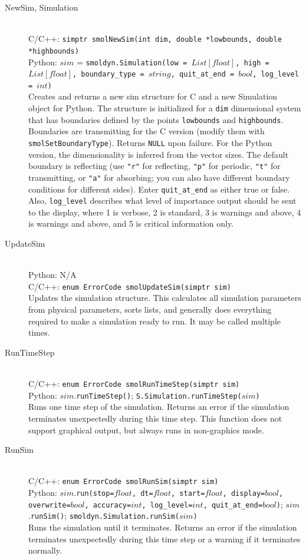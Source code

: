 \documentclass {scrbook}
\newcommand {\ttt} {\texttt}
\begin{document}
\begin{description}

\item[NewSim, Simulation]
\hfill \\
C/C++: \ttt{simptr smolNewSim(int dim, double *lowbounds, double *highbounds)}\\
Python: $sim$ = \ttt{smoldyn.Simulation(low = $List[float]$, high = $List[float]$, boundary\_type = $string$, quit\_at\_end = $bool$, log\_level = $int$)}\\
Creates and returns a new sim structure for C and a new Simulation object for Python. The structure is initialized for a \ttt{dim} dimensional system that has boundaries defined by the points \ttt{lowbounds} and \ttt{highbounds}. Boundaries are transmitting for the C version (modify them with \ttt{smolSetBoundaryType}). Returns \ttt{NULL} upon failure. For the Python version, the dimensionality is inferred from the vector sizes. The default boundary is reflecting (use \ttt{"r"} for reflecting, \ttt{"p"} for periodic, \ttt{"t"} for transmitting, or \ttt{"a"} for absorbing; you can also have different boundary conditions for different sides). Enter \ttt{quit\_at\_end} as either true or false. Also, \ttt{log\_level} describes what level of importance output should be sent to the display, where 1 is verbose, 2 is standard, 3 is warnings and above, 4 is warnings and above, and 5 is critical information only.

\item[UpdateSim]
\hfill \\
Python: N/A\\
C/C++: \ttt{enum ErrorCode smolUpdateSim(simptr sim)}\\
Updates the simulation structure. This calculates all simulation parameters from physical parameters, sorts lists, and generally does everything required to make a simulation ready to run. It may be called multiple times.

\item[RunTimeStep]
\hfill \\
C/C++: \ttt{enum ErrorCode smolRunTimeStep(simptr sim)}\\
Python: $sim$.\ttt{runTimeStep()}; \ttt{S.Simulation.runTimeStep($sim$)}\\
Runs one time step of the simulation. Returns an error if the simulation terminates unexpectedly during this time step. This function does not support graphical output, but always runs in non-graphics mode.

\item[RunSim]
\hfill \\
C/C++: \ttt{enum ErrorCode smolRunSim(simptr sim)}\\
Python: $sim$.\ttt{run(stop=$float$, dt=$float$, start=$float$, display=$bool$, overwrite=$bool$, accuracy=$int$, log\_level=$int$, quit\_at\_end=$bool$)}; $sim$.\ttt{runSim()}; \ttt{smoldyn.Simulation.runSim($sim$)}\\
Runs the simulation until it terminates. Returns an error if the simulation terminates unexpectedly during this time step or a warning if it terminates normally.


\end{description}
\end{document}

